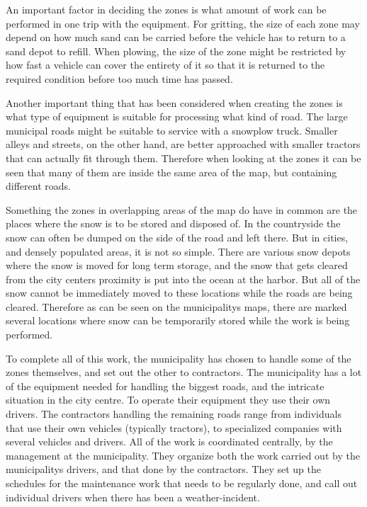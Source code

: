 An important factor in deciding the zones is what amount of work can be performed in one trip with the equipment. For gritting, the size of each zone may depend on how much sand can be carried before the vehicle has to return to a sand depot to refill. When plowing, the size of the zone might be restricted by how fast a vehicle can cover the entirety of it so that it is returned to the required condition before too much time has passed.

Another important thing that has been considered when creating the zones is what type of equipment is suitable for processing what kind of road. The large municipal roads might be suitable to service with a snowplow truck. Smaller alleys and streets, on the other hand, are better approached with smaller tractors that can actually fit through them. Therefore when looking at the zones it can be seen that many of them are inside the same area of the map, but containing different roads.

Something the zones in overlapping areas of the map do have in common are the places where the snow is to be stored and disposed of. In the countryside the snow can often be dumped on the side of the road and left there. But in cities, and densely populated areas, it is not so simple. There are various snow depots where the snow is moved for long term storage, and the snow that gets cleared from the city centers proximity is put into the ocean at the harbor. But all of the snow cannot be immediately moved to these locations while the roads are being cleared. Therefore as can be seen on the municipalitys maps, there are marked several locations where snow can be temporarily stored while the work is being performed.

To complete all of this work, the municipality has chosen to handle some of the zones themselves, and set out the other to contractors. The municipality has a lot of the equipment needed for handling the biggest roads, and the intricate situation in the city centre. To operate their equipment they use their own drivers. The contractors handling the remaining roads range from individuals that use their own vehicles (typically tractors), to specialized companies with several vehicles and drivers. All of the work is coordinated centrally, by the management at the municipality. They organize both the work carried out by the municipalitys drivers, and that done by the contractors. They set up the schedules for the maintenance work that needs to be regularly done, and call out individual drivers when there has been a weather-incident.

